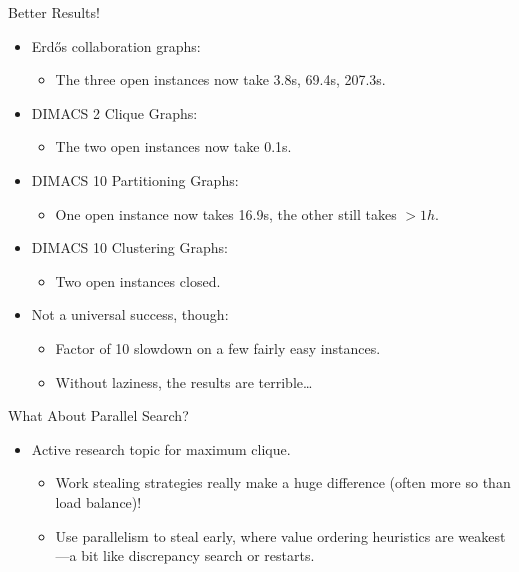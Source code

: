 \documentclass{beamer}
\begin{document}
\begin{frame}{Better Results!}
    \begin{itemize}
        \item Erd\H{o}s collaboration graphs:
            \begin{itemize}
                \item The three open instances now take 3.8s, 69.4s, 207.3s.
            \end{itemize}

        \item DIMACS 2 Clique Graphs:
            \begin{itemize}
                \item The two open instances now take 0.1s.
            \end{itemize}

        \item DIMACS 10 Partitioning Graphs:
            \begin{itemize}
                \item One open instance now takes 16.9s, the other still takes $>1h$.
            \end{itemize}

        \item DIMACS 10 Clustering Graphs:
            \begin{itemize}
                \item Two open instances closed.
            \end{itemize}

        \item Not a universal success, though:
            \begin{itemize}
                \item Factor of 10 slowdown on a few fairly easy instances.
                \item Without laziness, the results are terrible\ldots
            \end{itemize}
    \end{itemize}
\end{frame}

\begin{frame}{What About Parallel Search?}

    \begin{itemize}
        \item Active research topic for maximum clique.
            \begin{itemize}
                \item Work stealing strategies really make a huge difference (often more so than
                    load balance)!
                \item Use parallelism to steal early, where value ordering heuristics are
                    weakest---a bit like discrepancy search or restarts.
            \end{itemize}
    \end{itemize}
\end{frame}
\end{document}
